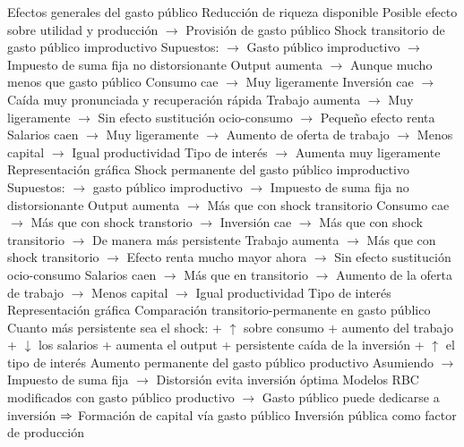 \documentclass{nuevotema}
\begin{document}
\begin{esquemal}
				\4 Efectos generales del gasto público
				\4[] Reducción de riqueza disponible
				\4[] Posible efecto sobre utilidad y producción
				\4[] $\to$ Provisión de gasto público
				\4 Shock transitorio de gasto público improductivo
				\4[] Supuestos:
				\4[] $\to$ Gasto público improductivo
				\4[] $\to$ Impuesto de suma fija no distorsionante
				\4[] Output aumenta
				\4[] $\to$ Aunque mucho menos que gasto público
				\4[] Consumo cae
				\4[] $\to$ Muy ligeramente
				\4[] Inversión cae
				\4[] $\to$ Caída muy pronunciada y recuperación rápida
				\4[] Trabajo aumenta
				\4[] $\to$ Muy ligeramente
				\4[] $\to$ Sin efecto sustitución ocio-consumo
				\4[] $\to$ Pequeño efecto renta
				\4[] Salarios caen
				\4[] $\to$ Muy ligeramente
				\4[] $\to$ Aumento de oferta de trabajo
				\4[] $\to$ Menos capital
				\4[] $\to$ Igual productividad
				\4[] Tipo de interés
				\4[] $\to$ Aumenta muy ligeramente
				\4[] Representación gráfica
				\4[] 
				\4 Shock permanente del gasto público improductivo
				\4[] Supuestos:
				\4[] $\to$ gasto público improductivo
				\4[] $\to$ Impuesto de suma fija no distorsionante
				\4[] Output aumenta
				\4[] $\to$  Más que con shock transitorio
				\4[] Consumo cae
				\4[] $\to$ Más que con shock transtorio
				\4[] $\to$ Inversión cae
				\4[] $\to$ Más que con shock transitorio
				\4[] $\to$ De manera más persistente
				\4[] Trabajo aumenta
				\4[] $\to$ Más que con shock transitorio
				\4[] $\to$ Efecto renta mucho mayor ahora
				\4[] $\to$ Sin efecto sustitución ocio-consumo
				\4[] Salarios caen
				\4[] $\to$ Más que en transitorio
				\4[] $\to$ Aumento de la oferta de trabajo
				\4[] $\to$ Menos capital
				\4[] $\to$ Igual productividad
				\4[] Tipo de interés
				\4 Representación gráfica
				\4[] 
				\4 Comparación transitorio-permanente en gasto público
				\4[] Cuanto más persistente sea el shock:
				\4[Consumo] + $\uparrow$ sobre consumo
				\4[Trabajo] + aumento del trabajo
				\4[Salarios] + $\downarrow$ los salarios
				\4[Output] + aumenta el output
				\4[Inversión] + persistente caída de la inversión
				 + $\uparrow$ el tipo de interés
				\4 Aumento permanente del gasto público productivo
				\4[] Asumiendo
				\4[] $\to$ Impuesto de suma fija
				\4[] $\to$ Distorsión evita inversión óptima
				\4[] Modelos RBC modificados con gasto público productivo
				\4[] $\to$ Gasto público puede dedicarse a inversión
				\4[] $\Rightarrow$ Formación de capital vía gasto público
				\4[] Inversión pública como factor de producción

\end{esquemal}
\end{document}
